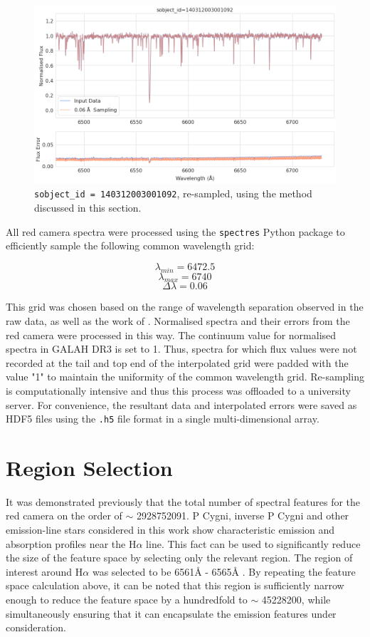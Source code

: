 \begin{figure}[!htb]
\centering
\includegraphics[scale=.45]{figures/resampling example.png}
\caption{\texttt{sobject\_id = 140312003001092}, re-sampled, using the method discussed in this section.}
\end{figure}

All red camera spectra were processed using the \texttt{spectres} Python package \citep{carnall2017spectres} to efficiently sample  the following common wavelength grid:

\[\lambda_{min} = 6472.5\]
\[\lambda_{max} = 6740\]
\[\Delta\lambda = 0.06\]

This grid was chosen based on the range of wavelength separation observed in the raw data, as well as the work of \citet{vcotar2021galah}. Normalised spectra and their errors from the red camera were processed in this way. The continuum value for normalised spectra in GALAH DR3 is set to 1. Thus, spectra for which flux values were not recorded at the tail and top end of the interpolated grid were padded with the value "1" to maintain the uniformity of the common wavelength grid. Re-sampling is computationally intensive and thus this process was offloaded to a university server. For convenience, the resultant data and interpolated errors were saved as HDF5 files using the \texttt{.h5} file format in a single multi-dimensional array. 

\section{Region Selection}

It was demonstrated previously that the total number of spectral features for the red camera on the order of $\sim$ \num[round-precision=2,round-mode=figures, scientific-notation=true]{2928752091}. P Cygni, inverse P Cygni and other emission-line stars considered in this work show characteristic emission and absorption profiles near the H$\alpha$ line. This fact can be used to significantly reduce the size of the feature space by selecting only the relevant region. The region of interest around H$\alpha$ was selected to be 6561\r{A} - 6565\r{A} \citep{traven2017galah}. By repeating the feature space calculation above, it can be noted that this region is sufficiently narrow enough to reduce the feature space by a hundredfold to $\sim$ \num[round-precision=2,round-mode=figures, scientific-notation=true]{45228200}, while simultaneously ensuring that it can encapsulate the emission features under consideration. 

